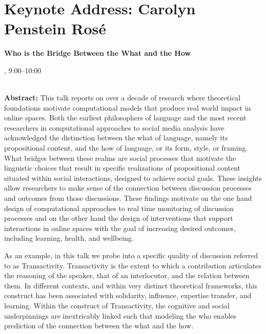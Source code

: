 \section{Keynote Address: Carolyn Penstein Rosé}

\begin{center}
\begin{Large}
{\bfseries\Large Who is the Bridge Between the What and the How}
\vspace{1em}\par
\end{Large}

\daydateyear, 9:00--10:00 \vspace{1em}\\
\PlenaryLoc \\
\vspace{1em}\par
\end{center}

\noindent

{\bf Abstract:} This talk reports on over a decade of research where theoretical foundations motivate computational models that produce real world impact in online spaces. Both the earliest philosophers of language and the most recent researchers in computational approaches to social media analysis have acknowledged the distinction between the what of language, namely its propositional content, and the how of language, or its form, style, or framing. What bridges between these realms are social processes that motivate the linguistic choices that result in specific realizations of propositional content situated within social interactions, designed to achieve social goals. These insights allow researchers to make sense of the connection between discussion processes and outcomes from those discussions. These findings motivate on the one hand design of computational approaches to real time monitoring of discussion processes and on the other hand the design of interventions that support interactions in online spaces with the goal of increasing desired outcomes, including learning, health, and wellbeing.

As an example, in this talk we probe into a specific quality of discussion referred to as Transactivity. Transactivity is the extent to which a contribution articulates the reasoning of the speaker, that of an interlocutor, and the relation between them. In different contexts, and within very distinct theoretical frameworks, this construct has been associated with solidarity, influence, expertise transfer, and learning. Within the construct of Transactivity, the cognitive and social underpinnings are inextricably linked such that modeling the who enables prediction of the connection between the what and the how.

